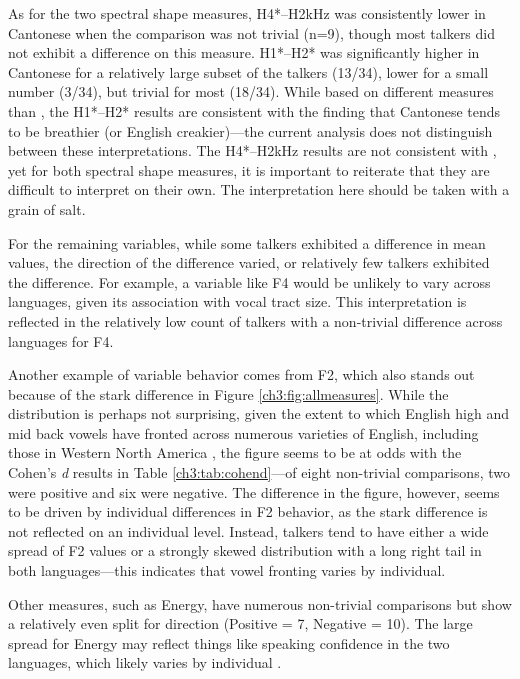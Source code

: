 As for the two spectral shape measures, H4*--H2kHz was consistently lower in Cantonese when the comparison was not trivial (n=9), though most talkers did not exhibit a difference on this measure. H1*--H2* was significantly higher in Cantonese for a relatively large subset of the talkers (13/34), lower for a small number (3/34), but trivial for most (18/34). While based on different measures than \citep{ng_2012_ltas}, the H1*--H2* results are consistent with the finding that Cantonese tends to be breathier (or English creakier)---the current analysis does not distinguish between these interpretations. The H4*--H2kHz results are not consistent with \citet{ng_2012_ltas}, yet for both spectral shape measures, it is important to reiterate that they are difficult to interpret on their own. The interpretation here should be taken with a grain of salt. 

For the remaining variables, while some talkers exhibited a difference in mean values, the direction of the difference varied, or relatively few talkers exhibited the difference. For example, a variable like F4 would be unlikely to vary across languages, given its association with vocal tract size. This interpretation is reflected in the relatively low count of talkers with a non-trivial difference across languages for F4. 

Another example of variable behavior comes from F2, which also stands out because of the stark difference in Figure \ref{ch3:fig:allmeasures}. While the distribution is perhaps not surprising, given the extent to which English high and mid back vowels have fronted across numerous varieties of English, including those in Western North America \citep{labov_2008_atlas}, the figure seems to be at odds with the Cohen's \textit{d} results in Table \ref{ch3:tab:cohend}---of eight non-trivial comparisons, two were positive and six were negative. The difference in the figure, however, seems to be driven by individual differences in F2 behavior, as the stark difference is not reflected on an individual level. Instead, talkers tend to have either a wide spread of F2 values or a strongly skewed distribution with a long right tail in both languages---this indicates that vowel fronting varies by individual. 

Other measures, such as Energy, have numerous non-trivial comparisons but show a relatively even split for direction (Positive = 7, Negative = 10). The large spread for Energy may reflect things like speaking confidence in the two languages, which likely varies by individual \citep{jarvinen_2013_speaking}.

